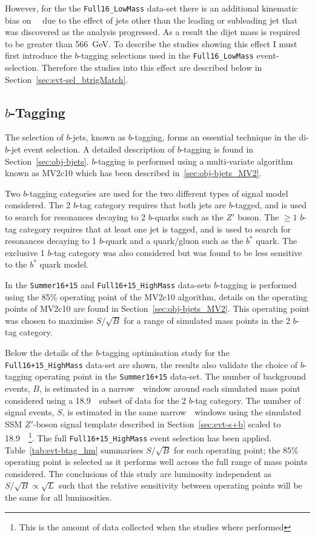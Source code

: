 However, for the the \verb|Full16_LowMass| data-set
there is an additional kinematic bias on~\mjj~
due to the effect of jets other than the leading or subleading jet
that was discovered as the analysis progressed.
As a result the dijet mass is required to be greater than 566~GeV.
To describe the studies showing this effect I must first introduce
the $b$-tagging selections used in the \verb|Full16_LowMass| event-selection.
Therefore the studies into this effect are described below in Section~\ref{sec:evt-sel_btrigMatch}.

\subsection{$b$-Tagging}
\label{sec:evt-sel-btag}

The selection of $b$-jets, known as $b$-tagging,
forms an essential technique in the di-$b$-jet event selection.
A detailed description of $b$-tagging is found in Section~\ref{sec:obj-bjets}.
$b$-tagging is performed using a multi-variate algorithm known as MV2c10 which has been described in~\ref{sec:obj-bjets_MV2}.

Two $b$-tagging categories are used for the two different types of signal model considered.
The 2 $b$-tag category requires that both jets are $b$-tagged,
and is used to search for resonances decaying to 2 $b$-quarks such as the $Z'$ boson.
The $\geq 1$ $b$-tag category requires that at least one jet is tagged,
and is used to search for resonances decaying to 1 $b$-quark and a quark/gluon such as the $b^*$ quark.
The exclusive 1 $b$-tag category was also considered but was found to be less sensitive to the $b^*$ quark model.

In the \verb|Summer16+15| and \verb|Full16+15_HighMass| data-sets
$b$-tagging is performed using the 85\% operating point of the MV2c10 algorithm,
details on the operating points of MV2c10 are found in Section~\ref{sec:obj-bjets_MV2}.
This operating point was chosen to maximise $S/\sqrt{B}$ for a range of simulated mass points in the 2 $b$-tag category.

Below the details of the $b$-tagging optimisation study for the \verb|Full16+15_HighMass| data-set are shown,
the results also validate the choice of $b$-tagging operating point in the \verb|Summer16+15| data-set.
The number of background events, $B$, is estimated in
a narrow~\mjj~window around
each simulated mass point considered using a
18.9~\ifb~subset of data for the 2 $b$-tag category.
The number of signal events, $S$, is estimated
in the same narrow~\mjj~windows using 
the simulated SSM $Z'$-boson signal template
described in Section~\ref{sec:evt-s+b} scaled to 18.9~\ifb~\footnote{This is
  the amount of data collected when the studies where performed}.
The full \verb|Full16+15_HighMass| event selection has been applied.
Table~\ref{tab:evt-btag_hm} summarises $S/\sqrt{B}$ for each operating point;
the 85\% operating point is selected as it performs well across the full range of mass points considered.
The conclusions of this study are luminosity independent
as $S/\sqrt{B} \propto \sqrt{L}$ such that the relative sensitivity
between operating points will be the same for all luminosities.

